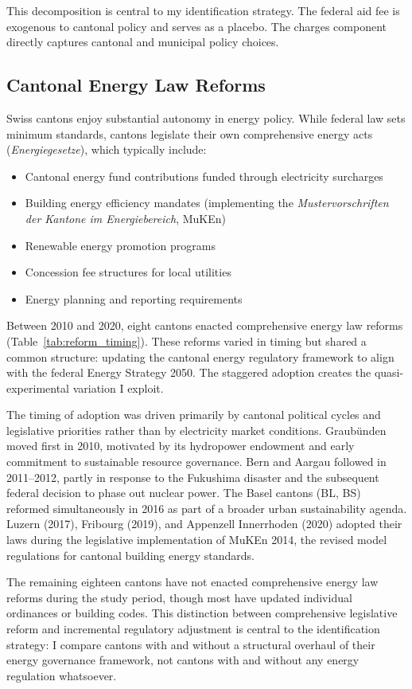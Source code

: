 \documentclass[12pt]{article}
\begin{document}
This decomposition is central to my identification strategy. The federal aid fee is exogenous to cantonal policy and serves as a placebo. The charges component directly captures cantonal and municipal policy choices.

\subsection{Cantonal Energy Law Reforms}

Swiss cantons enjoy substantial autonomy in energy policy. While federal law sets minimum standards, cantons legislate their own comprehensive energy acts (\textit{Energiegesetze}), which typically include:
\begin{itemize}
    \item Cantonal energy fund contributions funded through electricity surcharges
    \item Building energy efficiency mandates (implementing the \textit{Mustervorschriften der Kantone im Energiebereich}, MuKEn)
    \item Renewable energy promotion programs
    \item Concession fee structures for local utilities
    \item Energy planning and reporting requirements
\end{itemize}

Between 2010 and 2020, eight cantons enacted comprehensive energy law reforms (Table~\ref{tab:reform_timing}). These reforms varied in timing but shared a common structure: updating the cantonal energy regulatory framework to align with the federal Energy Strategy 2050. The staggered adoption creates the quasi-experimental variation I exploit.

The timing of adoption was driven primarily by cantonal political cycles and legislative priorities rather than by electricity market conditions. Graubünden moved first in 2010, motivated by its hydropower endowment and early commitment to sustainable resource governance. Bern and Aargau followed in 2011--2012, partly in response to the Fukushima disaster and the subsequent federal decision to phase out nuclear power. The Basel cantons (BL, BS) reformed simultaneously in 2016 as part of a broader urban sustainability agenda. Luzern (2017), Fribourg (2019), and Appenzell Innerrhoden (2020) adopted their laws during the legislative implementation of MuKEn 2014, the revised model regulations for cantonal building energy standards.

The remaining eighteen cantons have not enacted comprehensive energy law reforms during the study period, though most have updated individual ordinances or building codes. This distinction between comprehensive legislative reform and incremental regulatory adjustment is central to the identification strategy: I compare cantons with and without a structural overhaul of their energy governance framework, not cantons with and without any energy regulation whatsoever.
\end{document}
